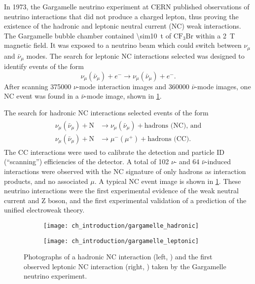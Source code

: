 In 1973, the Gargamelle neutrino experiment at CERN
published observations of neutrino interactions
that did not produce a charged lepton,
thus proving the existence of the hadronic \cite{gargamelle,gargamelle_short}
and leptonic \cite{gargamelle_leptonic} neutral current (NC) weak interactions.
The Gargamelle bubble chamber contained \SI{\sim10}{\tonne} of
$\text{CF}_3\text{Br}$ within a \SI{2}{\tesla} magnetic field.
It was exposed to a neutrino beam which could switch
between $\nu_\mu$ and $\bar{\nu}_\mu$ modes.
The search for leptonic NC interactions selected was designed
to identify events of the form
\begin{equation}\label{eq:leptonic_neutral_current}
    \nu_\mu(\bar{\nu}_\mu) + e^- \to \nu_\mu(\bar{\nu}_\mu) + e^-.
\end{equation}
After scanning \num{375000} $\nu$-mode interaction images
and \num{360000} $\bar{\nu}$-mode images,
one NC event was found in a $\bar{\nu}$-mode image,
shown in \cref{fig:gargamelle}.

The search for hadronic NC interactions selected events of the form
\begin{align}\label{eq:neutral_current}
    \begin{split}
        \nu_\mu(\bar{\nu}_\mu) + \text{N} &\to \nu_\mu(\bar{\nu}_\mu)
        + \text{hadrons (NC), and} \\
        \nu_\mu(\bar{\nu}_\mu) + \text{N} &\to \mu^-(\mu^+) + \text{hadrons (CC)}.
    \end{split}
\end{align}
The CC interactions were used to calibrate the detection and particle ID (``scanning'')
efficiencies of the detector.
A total of 102 $\nu$- and 64 $\bar{\nu}$-induced interactions were observed
with the NC signature of only hadrons as interaction products,
and no associated $\mu$.
A typical NC event image is shown in \cref{fig:gargamelle}.
These neutrino interactions were the first experimental evidence
of the weak neutral current and Z boson,
and the first experimental validation of a prediction of
the unified electroweak theory.


\begin{figure}
    \centering
    \begin{subfigure}{0.49\textwidth}
        \texttt{[image: ch\_introduction/gargamelle\_hadronic]}
    \end{subfigure}
    \begin{subfigure}{0.49\textwidth}
        \texttt{[image: ch\_introduction/gargamelle\_leptonic]}
    \end{subfigure}
    \caption{
        Photographs of a hadronic NC interaction (left, \cite{gargamelle})
        and the first observed leptonic NC interaction
        (right, \cite{gargamelle_leptonic_image})
        taken by the Gargamelle neutrino experiment.
    }
    \label{fig:gargamelle}
\end{figure}

